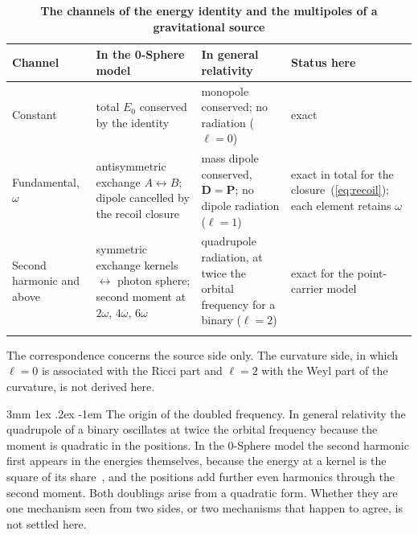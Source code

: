 \documentclass[%
 reprint, amsmath,amssymb, aps, prb, ]{revtex4-2}
\makeatletter
\numberwithin{equation}{section}
\renewcommand\paragraph{%
  \@startsection{paragraph}{4}{\z@}%
    {3mm \@plus 1ex \@minus .2ex}%
    {-1em}%
    {\normalfont\normalsize\itshape}}
\makeatother
\begin{document}
\begin{table}[t!]
\centering
\caption{\textbf{The channels of the energy identity and the multipoles of a gravitational source}}
\label{tab:corr}
\renewcommand{\arraystretch}{1.4}
\begin{tabular}{p{3.2cm}p{4.6cm}p{4.0cm}p{3.7cm}}
\toprule
\raggedright \textbf{Channel} & \raggedright \textbf{In the 0-Sphere model} & \raggedright \textbf{In general relativity} & \raggedright \textbf{Status here} \tabularnewline
\midrule
\raggedright Constant
& \raggedright total $E_0$ conserved by the identity
& \raggedright monopole conserved; no radiation \mbox{($\ell = 0$)}
& \raggedright exact \tabularnewline
\addlinespace[0.3cm]
\raggedright Fundamental, $\omega$
& \raggedright antisymmetric exchange $A \leftrightarrow B$; dipole cancelled by the recoil closure
& \raggedright mass dipole conserved, \mbox{$\dot{\bm D} = \bm P$}; no dipole radiation \mbox{($\ell = 1$)}
& \raggedright exact in total for the closure~(\ref{eq:recoil}); each element retains $\omega$ \tabularnewline
\addlinespace[0.3cm]
\raggedright Second harmonic and above
& \raggedright symmetric exchange kernels $\leftrightarrow$ photon sphere; second moment at $2\omega$, $4\omega$, $6\omega$
& \raggedright quadrupole radiation, at twice the orbital frequency for a binary \mbox{($\ell = 2$)}
& \raggedright exact for the point-carrier model \tabularnewline
\addlinespace[0.2cm]
\bottomrule
\end{tabular}
\vspace{0.2cm}
\begin{minipage}{0.95\textwidth}
\justifying\footnotesize
The correspondence concerns the source side only. The curvature side, in which $\ell = 0$ is associated with the Ricci part and $\ell = 2$ with the Weyl part of the curvature, is not derived here.
\end{minipage}
\end{table}

\paragraph{The origin of the doubled frequency.} In general relativity the quadrupole of a binary oscillates at twice the orbital frequency because the moment is quadratic in the positions. In the 0-Sphere model the second harmonic first appears in the energies themselves, because the energy at a kernel is the square of its share~\cite{H65,H66}, and the positions add further even harmonics through the second moment. Both doublings arise from a quadratic form. Whether they are one mechanism seen from two sides, or two mechanisms that happen to agree, is not settled here.
\end{document}
